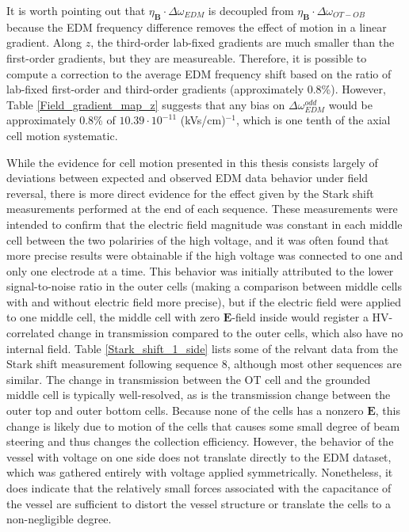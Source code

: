 \documentclass [10pt, twoside] {uwthesis}[2012/04/02]
\begin{document}
It is worth pointing out that $\eta_{\mathbf{B}}\cdot\Delta\omega_{EDM}$ is decoupled from $\eta_{\mathbf{B}}\cdot\Delta\omega_{OT-OB}$ because the EDM frequency difference removes the effect of motion in a linear gradient. Along $z$, the third-order lab-fixed gradients are much smaller than the first-order gradients, but they are measureable. Therefore, it is possible to compute a correction to the average EDM frequency shift based on the ratio of lab-fixed first-order and third-order gradients (approximately 0.8\%). However, Table \ref{Field_gradient_map_z} suggests that any bias on $\Delta\omega^{odd}_{EDM}$ would be approximately 0.8\% of $10.39\cdot 10^{-11}$ (kVs/cm)$^{-1}$, which is one tenth of the axial cell motion systematic.

While the evidence for cell motion presented in this thesis consists largely of deviations between expected and observed EDM data behavior under field reversal, there is more direct evidence for the effect given by the Stark shift measurements performed at the end of each sequence. These measurements were intended to confirm that the electric field magnitude was constant in each middle cell between the two polariries of the high voltage, and it was often found that more precise results were obtainable if the high voltage was connected to one and only one electrode at a time. This behavior was initially attributed to the lower signal-to-noise ratio in the outer cells (making a comparison between middle cells with and without electric field more precise), but if the electric field were applied to one middle cell, the middle cell with zero $\mathbf{E}$-field inside would register a HV-correlated change in transmission compared to the outer cells, which also have no internal field. Table \ref{Stark_shift_1_side} lists some of the relvant data from the Stark shift measurement following sequence 8, although most other sequences are similar. The change in transmission between the OT cell and the grounded middle cell is typically well-resolved, as is the transmission change between the outer top and outer bottom cells. Because none of the cells has a nonzero $\mathbf{E}$, this change is likely due to motion of the cells that causes some small degree of beam steering and thus changes the collection efficiency. However, the behavior of the vessel with voltage on one side does not translate directly to the EDM dataset, which was gathered entirely with voltage applied symmetrically. Nonetheless, it does indicate that the relatively small forces associated with the capacitance of the vessel are sufficient to distort the vessel structure or translate the cells to a non-negligible degree.
\end{document}
